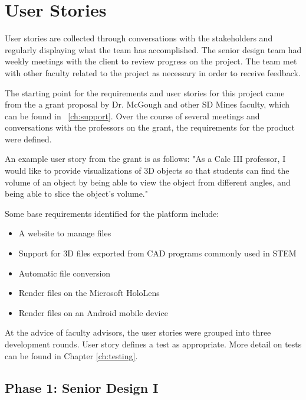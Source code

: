 \section{User Stories}

User stories are collected through conversations with the stakeholders and
regularly displaying what the team has accomplished. The senior design team had
weekly meetings with the client to review progress on the project. The team met
with other faculty related to the project as necessary in order to receive
feedback.

The starting point for the requirements and user stories for this project came
from the a grant proposal by Dr. McGough and other SD Mines faculty,
which can be found in ~\autoref{ch:support}. Over the course of several
meetings and conversations with the professors on the grant, the
requirements for the product were defined.

An example user story from the grant is as follows: "As a Calc III
professor, I would like to provide visualizations of 3D objects so that
students can find the volume of an object by being able to view the object
from different angles, and being able to slice the object's volume."

Some base requirements identified for the platform include:
\begin{itemize}
	\item A website to manage files
	\item Support for 3D files exported from CAD programs commonly used in STEM
	\item Automatic file conversion
	\item Render files on the Microsoft HoloLens
	\item Render files on an Android mobile device
\end{itemize}

At the advice of faculty advisors, the user stories were grouped into three 
development rounds. User story defines a test as appropriate. More detail on tests can be found in Chapter \ref{ch:testing}.

\subsection{Phase 1: Senior Design I}

